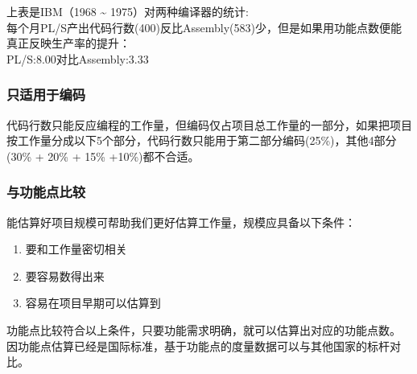 \documentclass{book}        %
\providecommand{\tightlist}{%
  \setlength{\itemsep}{0pt}\setlength{\parskip}{0pt}}
\begin{document}
上表是IBM（1968 \textasciitilde{} 1975）对两种编译器的统计:\\
每个月PL/S产出代码行数(400)反比Assembly(583)少，但是如果用功能点数便能真正反映生产率的提升：\\
PL/S:8.00对比Assembly:3.33

\hypertarget{ux53eaux9002ux7528ux4e8eux7f16ux7801}{%
\subsubsection{只适用于编码}\label{ux53eaux9002ux7528ux4e8eux7f16ux7801}}

代码行数只能反应编程的工作量，但编码仅占项目总工作量的一部分，如果把项目按工作量分成以下5个部分，代码行数只能用于第二部分编码(25\%)，其他4部分(30\%
+ 20\% + 15\% +10\%)都不合适。


\hypertarget{ux4e0eux529fux80fdux70b9ux6bd4ux8f83}{%
\subsubsection{与功能点比较}\label{ux4e0eux529fux80fdux70b9ux6bd4ux8f83}}

能估算好项目规模可帮助我们更好估算工作量，规模应具备以下条件：

\begin{enumerate}
\tightlist
\item
  要和工作量密切相关
\item
  要容易数得出来
\item
  容易在项目早期可以估算到\\
\end{enumerate}

功能点比较符合以上条件，只要功能需求明确，就可以估算出对应的功能点数。\\
因功能点估算已经是国际标准，基于功能点的度量数据可以与其他国家的标杆对比。
\end{document}
